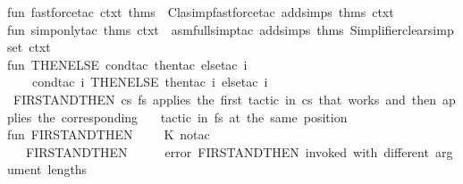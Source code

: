\begin{isabellebody}
\isanewline
fun\ fastforce{\isacharunderscore}{\kern0pt}tac\ ctxt\ thms\ {\isacharequal}{\kern0pt}\ Clasimp{\isachardot}{\kern0pt}fast{\isacharunderscore}{\kern0pt}force{\isacharunderscore}{\kern0pt}tac\ {\isacharparenleft}{\kern0pt}add{\isacharunderscore}{\kern0pt}simps\ thms\ ctxt{\isacharparenright}{\kern0pt}\isanewline
\isanewline
fun\ simp{\isacharunderscore}{\kern0pt}only{\isacharunderscore}{\kern0pt}tac\ thms\ ctxt\ {\isacharequal}{\kern0pt}\ asm{\isacharunderscore}{\kern0pt}full{\isacharunderscore}{\kern0pt}simp{\isacharunderscore}{\kern0pt}tac\ {\isacharparenleft}{\kern0pt}add{\isacharunderscore}{\kern0pt}simps\ thms\ {\isacharparenleft}{\kern0pt}Simplifier{\isachardot}{\kern0pt}clear{\isacharunderscore}{\kern0pt}simpset\ ctxt{\isacharparenright}{\kern0pt}{\isacharparenright}{\kern0pt}\isanewline
{\isacartoucheclose}\ \ \ \ \ \ \ \ \ \ \ \ \ \ \ \ \ \ \ \ \ \ \ \ \ \isanewline
\isanewline
{}\isamarkupfalse%
\ \isanewline
{\isacartoucheopen}\isanewline
\isanewline
fun\ THEN{\isacharunderscore}{\kern0pt}ELSE{\isacharprime}{\kern0pt}\ cond{\isacharunderscore}{\kern0pt}tac\ {\isacharparenleft}{\kern0pt}then{\isacharunderscore}{\kern0pt}tac{\isacharcomma}{\kern0pt}\ else{\isacharunderscore}{\kern0pt}tac{\isacharparenright}{\kern0pt}\ i\ {\isacharequal}{\kern0pt}\ \isanewline
\ \ \ \ {\isacharparenleft}{\kern0pt}cond{\isacharunderscore}{\kern0pt}tac\ i{\isacharparenright}{\kern0pt}\ THEN{\isacharunderscore}{\kern0pt}ELSE\ {\isacharparenleft}{\kern0pt}then{\isacharunderscore}{\kern0pt}tac\ i{\isacharcomma}{\kern0pt}\ else{\isacharunderscore}{\kern0pt}tac\ i{\isacharparenright}{\kern0pt}\isanewline
\isanewline
\isanewline
{\isacharparenleft}{\kern0pt}{\isacharasterisk}{\kern0pt}\ FIRST{\isacharunderscore}{\kern0pt}AND{\isacharunderscore}{\kern0pt}THEN{\isacharprime}{\kern0pt}\ cs\ fs\ applies\ the\ first\ tactic\ in\ cs\ that\ works\ and\ then\ applies\ the\ corresponding\isanewline
\ \ \ tactic\ in\ fs\ at\ the\ same\ position{\isachardot}{\kern0pt}\ {\isacharasterisk}{\kern0pt}{\isacharparenright}{\kern0pt}\isanewline
fun\ FIRST{\isacharunderscore}{\kern0pt}AND{\isacharunderscore}{\kern0pt}THEN{\isacharprime}{\kern0pt}\ {\isacharbrackleft}{\kern0pt}{\isacharbrackright}{\kern0pt}\ {\isacharbrackleft}{\kern0pt}{\isacharbrackright}{\kern0pt}\ \ {\isacharequal}{\kern0pt}\ K\ no{\isacharunderscore}{\kern0pt}tac\isanewline
\ \ {\isacharbar}{\kern0pt}\ FIRST{\isacharunderscore}{\kern0pt}AND{\isacharunderscore}{\kern0pt}THEN{\isacharprime}{\kern0pt}\ {\isacharparenleft}{\kern0pt}{\isacharunderscore}{\kern0pt}\ {\isacharcolon}{\kern0pt}{\isacharcolon}{\kern0pt}\ {\isacharunderscore}{\kern0pt}{\isacharparenright}{\kern0pt}\ {\isacharbrackleft}{\kern0pt}{\isacharbrackright}{\kern0pt}\ {\isacharequal}{\kern0pt}\ error\ {\isachardoublequote}{\kern0pt}FIRST{\isacharunderscore}{\kern0pt}AND{\isacharunderscore}{\kern0pt}THEN{\isacharprime}{\kern0pt}\ invoked\ with\ different\ argument\ lengths{\isachardoublequote}{\kern0pt}\isanewline

\end{isabellebody}
